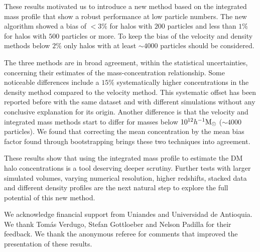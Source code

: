\documentclass{emulateapj}
\newcommand{\hMsun}{{\ifmmode{h^{-1}{\rm {M_{\odot}}}}\else{$h^{-1}{\rm{M_{\odot}}}$}\fi}}
\begin{document}
These results motivated us to introduce a new method based on the
integrated mass profile that show a robust performance at low particle
numbers. 
The new algorithm showed a bias  of $< 3\%$ for halos with $200$
particles and less than $1\%$ for halos with $500$ particles or more.  
To keep the bias of the velocity and density methods below $2\%$ only halos
with at least $\sim 4000$ particles should be considered.


The three methods are in broad agreement, within the statistical
uncertainties, concerning their estimates of the  mass-concentration
relationship. 
Some noticeable differences include a $15\%$ systematically higher 
concentrations in the density method compared to the velocity method.
This systematic offset has been reported before with the same dataset 
\citep{Prada2012} and with different simulations \citep{Klypin2016}
without any conclusive explanation for its origin. 
Another difference is that the velocity and integrated mass methods
start to differ for masses below $10^{12}\hMsun$ ($\sim 4000$
particles).   
We found that correcting the mean concentration by the mean bias
factor found through bootstrapping brings these two techniques into
agreement. 

These results show that using the integrated mass profile to estimate the
DM halo concentrations is a tool deserving deeper scrutiny.   
Further tests with larger simulated volumes, varying numerical
resolution, higher redshifts, stacked data and different density
profiles are the next natural step to explore the full potential of
this new method.   

\vspace{0.1cm}

 We acknowledge financial support from Uniandes
 and Universidad de Antioquia. 
 We thank Tom\'as Verdugo, Stefan Gottloeber and Nelson  Padilla for
their feedback.
We thank the anonymous referee for comments that improved
the presentation of these results. 


%
\end{document}
